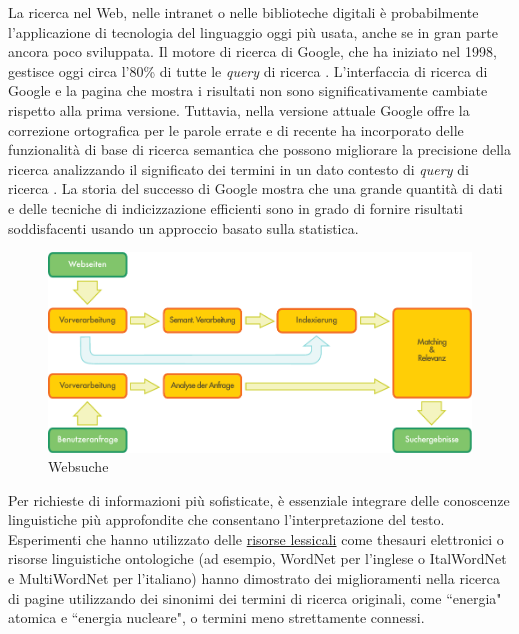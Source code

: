 \documentclass[]{../../metanetpaper}
\begin{document}
\begin{multicols}{2}
La ricerca nel Web, nelle intranet o nelle biblioteche digitali \`{e} probabilmente l'applicazione di tecnologia del linguaggio oggi pi\`{u} usata, anche se  in gran parte ancora poco sviluppata. Il motore di ricerca di Google, che ha iniziato nel 1998, gestisce oggi circa l'80\% di tutte le \emph{query} di ricerca \cite{spi1}. L'interfaccia di ricerca di Google e la pagina che mostra i risultati non sono significativamente cambiate rispetto alla prima versione. Tuttavia, nella versione attuale Google offre la correzione ortografica per le parole errate e di recente ha incorporato delle funzionalit\`{a} di base di ricerca semantica che possono migliorare la precisione della ricerca analizzando il significato dei termini in un dato contesto di \emph{query} di ricerca \cite{pc1}. La storia del successo di Google mostra che una grande quantit\`{a} di dati e delle tecniche di indicizzazione efficienti sono in grado di fornire risultati soddisfacenti usando un approccio basato sulla statistica.


\begin{figure}[htb]
  \center
  \includegraphics[width=\textwidth]{../_media/german/web_search_architecture}
  \caption{Websuche}
  \label{fig:websearcharch_de}
\end{figure}


Per richieste di informazioni pi\`{u} sofisticate, \`{e} essenziale integrare
delle conoscenze linguistiche pi\`{u} approfondite che consentano
l'interpretazione del testo. Esperimenti che hanno utilizzato delle
\underline{risorse lessicali} come thesauri elettronici o risorse linguistiche
ontologiche (ad esempio, WordNet per l'inglese o ItalWordNet e MultiWordNet
per l'italiano) hanno dimostrato dei miglioramenti nella ricerca di pagine
utilizzando dei sinonimi dei termini di ricerca originali, come “energia"
atomica e “energia nucleare", o termini meno strettamente connessi.


\end{multicols}
\end{document}
